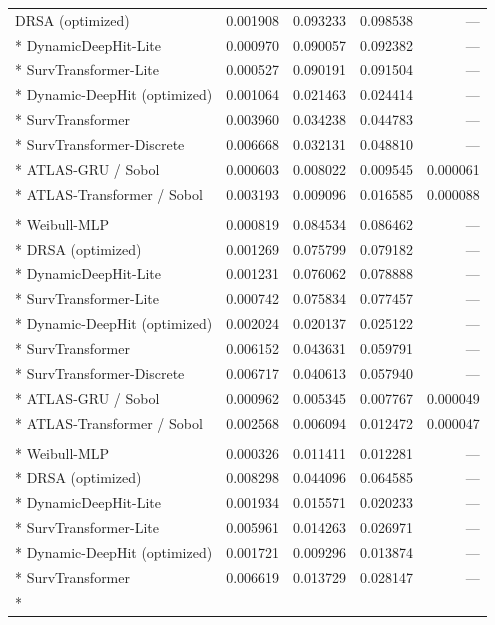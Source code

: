 \begin{longtable}{lrrrr}
DRSA (optimized) & 0.001908 & 0.093233 & 0.098538 & --- \\*
DynamicDeepHit-Lite & 0.000970 & 0.090057 & 0.092382 & --- \\*
SurvTransformer-Lite & 0.000527 & 0.090191 & 0.091504 & --- \\*
Dynamic-DeepHit (optimized) & 0.001064 & 0.021463 & 0.024414 & --- \\*
SurvTransformer & 0.003960 & 0.034238 & 0.044783 & --- \\*
SurvTransformer-Discrete & 0.006668 & 0.032131 & 0.048810 & --- \\*
ATLAS-GRU / Sobol & 0.000603 & 0.008022 & 0.009545 & 0.000061 \\*
ATLAS-Transformer / Sobol & 0.003193 & 0.009096 & 0.016585 & 0.000088 \\
\addlinespace
\multicolumn{5}{l}{\textit{Overall survival, landmark $L=20$}}\\*
Weibull-MLP & 0.000819 & 0.084534 & 0.086462 & --- \\*
DRSA (optimized) & 0.001269 & 0.075799 & 0.079182 & --- \\*
DynamicDeepHit-Lite & 0.001231 & 0.076062 & 0.078888 & --- \\*
SurvTransformer-Lite & 0.000742 & 0.075834 & 0.077457 & --- \\*
Dynamic-DeepHit (optimized) & 0.002024 & 0.020137 & 0.025122 & --- \\*
SurvTransformer & 0.006152 & 0.043631 & 0.059791 & --- \\*
SurvTransformer-Discrete & 0.006717 & 0.040613 & 0.057940 & --- \\*
ATLAS-GRU / Sobol & 0.000962 & 0.005345 & 0.007767 & 0.000049 \\*
ATLAS-Transformer / Sobol & 0.002568 & 0.006094 & 0.012472 & 0.000047 \\
\addlinespace
\multicolumn{5}{l}{\textit{Death A cumulative incidence, landmark $L=0$}}\\*
Weibull-MLP & 0.000326 & 0.011411 & 0.012281 & --- \\*
DRSA (optimized) & 0.008298 & 0.044096 & 0.064585 & --- \\*
DynamicDeepHit-Lite & 0.001934 & 0.015571 & 0.020233 & --- \\*
SurvTransformer-Lite & 0.005961 & 0.014263 & 0.026971 & --- \\*
Dynamic-DeepHit (optimized) & 0.001721 & 0.009296 & 0.013874 & --- \\*
SurvTransformer & 0.006619 & 0.013729 & 0.028147 & --- \\*

\end{longtable}
